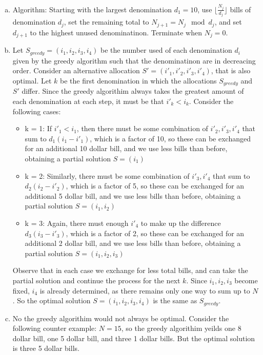 \documentclass{article}
\begin{document}
\begin{enumerate}[a)]
    \item Algorithm: Starting with the largest denomination $d_1 = 10$, use $\lfloor \frac{N_j}{d_j} \rfloor$ bills of denomination $d_j$, set the remaining total to $N_{j + 1} = N_{j}\mod d_{j}$, and set $d_{j + 1}$ to the highest unused denominatinon. Terminate when $N_{j} = 0$.
    \item Let $S_{greedy} = (i_1, i_2, i_3, i_4)$ be the number used of each denomination $d_i$ given by the greedy algorithm such that the denominatinon are in decreacing order. Consider an alternative allocation $S' =  (i'_1, i'_2, i'_3, i'_4)$, that is also optimal. Let $k$ be the first denomination in which the allocations $S_{greedy}$ and $S'$ differ. Since the greedy algorithim always takes the greatest amount of each denomination at each step, it must be that $i'_k < i_k$. Consider the following cases: 
    \begin{itemize}
        \item k = 1: If $i'_1 < i_1$, then there must be some combination of $i'_2, i'_3, i'_4$ that sum to $d_1(i_1 - i'_1)$, which is a factor of 10, so these can be exchanged for an additional 10 dollar bill, and we use less bills than before, obtaining a partial solution $S = (i_1)$
        \item k = 2: Similarly, there must be some combination of $i'_3, i'_4$ that sum to $d_2(i_2 - i'_2)$, which is a factor of 5, so these can be exchanged for an additional 5 dollar bill, and we use less bills than before, obtaining a partial solution $S = (i_1, i_2)$
        \item k = 3: Again, there must enough $i'_4$ to make up the difference $d_3(i_3 - i'_3)$, which is a factor of 2, so these can be exchanged for an additional 2 dollar bill, and we use less bills than before, obtaining a partial solution $S = (i_1, i_2, i_3)$
    \end{itemize}
    Observe that in each case we exchange for less total bills, and can take the partial solution and continue the process for the next $k$. Since $i_1, i_2, i_3$ become fixed, $i_4$ is already determined, as there remains only one way to sum up to $N$. So the optimal solution $S = (i_1, i_2, i_3, i_4)$ is the same as $S_{greedy}$.

    \item No the greedy algorithim would not always be optimal. Consider the following counter example: $N = 15$, so the greedy algorithim yeilds one 8 dollar bill, one 5 dollar bill, and three 1 dollar bills. But the optimal solution is three 5 dollar bills.
\end{enumerate}
\end{document}
